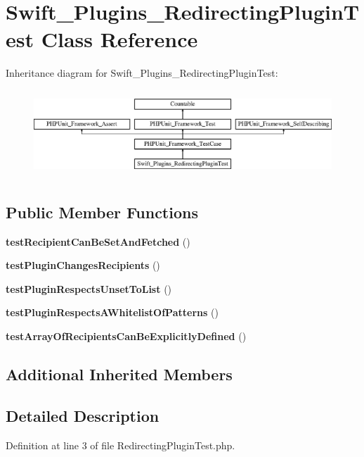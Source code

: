 \section{Swift\+\_\+\+Plugins\+\_\+\+Redirecting\+Plugin\+Test Class Reference}
\label{class_swift___plugins___redirecting_plugin_test}
Inheritance diagram for Swift\+\_\+\+Plugins\+\_\+\+Redirecting\+Plugin\+Test\+:\begin{figure}[H]
\begin{center}
\leavevmode
\includegraphics[height=3.303835cm]{class_swift___plugins___redirecting_plugin_test}
\end{center}
\end{figure}
\subsection*{Public Member Functions}
\begin{DoxyCompactItemize}
\item 
{\bf test\+Recipient\+Can\+Be\+Set\+And\+Fetched} ()
\item 
{\bf test\+Plugin\+Changes\+Recipients} ()
\item 
{\bf test\+Plugin\+Respects\+Unset\+To\+List} ()
\item 
{\bf test\+Plugin\+Respects\+A\+Whitelist\+Of\+Patterns} ()
\item 
{\bf test\+Array\+Of\+Recipients\+Can\+Be\+Explicitly\+Defined} ()
\end{DoxyCompactItemize}
\subsection*{Additional Inherited Members}


\subsection{Detailed Description}


Definition at line 3 of file Redirecting\+Plugin\+Test.\+php.




